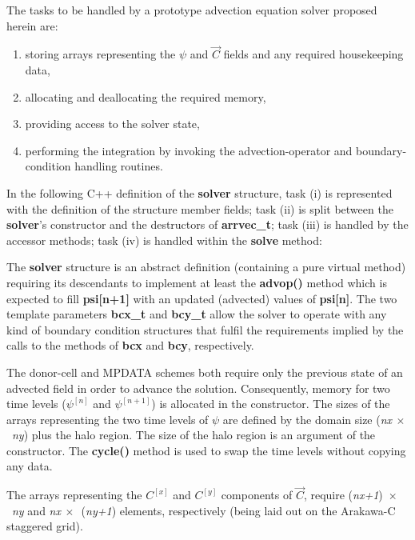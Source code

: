 \documentclass[twocolumn]{article}
\newcounter{lstnocpp}
\newcounter{linenocpp}
\newcommand*\FancyVerbStartString{}
\newcommand*\FancyVerbStopString{}
\newcommand{\codecpp}[4]{%
  \linespread{.8}
  \addtocounter{lstnocpp}{1}%
  \renewcommand*\FancyVerbStartString{\PY{c+c1}{//#2}}%
  \renewcommand*\FancyVerbStopString{\PY{c+c1}{//#3}}%
  \setcounter{FancyVerbLine}{\thelinenocpp}%
  \fvset{label={listing~C.\thelstnocpp~(C++)},rulecolor=\color{black},stepnumber=#4}%
  \setcounter{linenocpp}{\value{FancyVerbLine}}%
  \vspace{-1.5ex}
  \linespread{2}
}
\newcommand{\prog}[1]{{\rm\bf#1}}
\begin{document}
  The tasks to be handled by a prototype advection equation solver proposed herein are:
  \begin{enumerate}[label=(\roman*), leftmargin=*, widest=iii]
    \item{storing arrays representing the $\psi$ and $\vec{C}$ fields and any required housekeeping data,}
    \item{allocating and deallocating the required memory,}
    \item{providing access to the solver state,}
    \item{performing the integration by invoking the advection-operator and
      boundary-condition handling routines.}
  \end{enumerate}
  In the following C++ definition of the \prog{solver} structure, task (i) is represented with the definition of the structure
    member fields; task (ii) is split between the \prog{solver}'s constructor and the destructors of \prog{arrvec\_t};
    task (iii) is handled by the accessor methods; task (iv) is handled within the \prog{solve} method:
  \codecpp{code-cpp-listings.hpp}{listing16}{listing17}{1}
  The \prog{solver} structure is an abstract definition (containing a pure virtual method) 
     requiring its descendants to implement at least
     the \prog{advop()} method which is expected to fill \prog{psi[n+1]} with an updated (advected)
     values of \prog{psi[n]}.
  The two template parameters \prog{bcx\_t} and \prog{bcy\_t} allow the solver to operate with 
    any kind of boundary condition structures that fulfil the requirements implied by the calls to the 
    methods of \prog{bcx} and \prog{bcy}, respectively.

  The donor-cell and MPDATA schemes both require only the previous state of an advected field
    in order to advance the solution.
  Consequently, memory for two time levels ($\psi^{[n]}$ and $\psi^{[n+1]}$) is allocated in the
    constructor.
  The sizes of the arrays representing the two time levels of $\psi$ 
    are defined by the domain size ({\em nx}$~\times$~{\em ny}) plus the halo region.
  The size of the halo region is an argument of the constructor.
  The \prog{cycle()} method is used to swap the time levels without copying any data.

  The arrays representing the $C^{[x]}$ and $C^{[y]}$ components of $\vec{C}$,
    require ({\em nx+1})~$\times$~{\em ny} 
    and {\em nx}$~\times$~({\em ny+1}) elements, respectively
    (being laid out on the Arakawa-C staggered grid).
  
\end{document}
